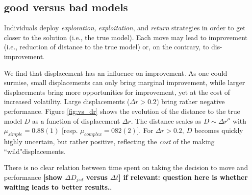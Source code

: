 %
%
%


\subsection{good versus bad models}
Individuals deploy {\it exploration}, {\it exploitation}, and {\it return} strategies in order to get closer to the solution (i.e., the true model). Each move may lead to improvement (i.e., reduction of distance to the true model) or, on the contrary, to dis-improvement. 

We find that displacement has an influence on improvement. As one could surmise, small displacements can only bring marginal improvement, while larger displacements bring more opportunities for improvement, yet at the cost of increased volatility. Large displacements ($\Delta r > 0.2$) bring rather negative performance. Figure \ref{fig:vs_dr} shows the evolution of the distance to the true model $D$ as a function of displacement $\Delta r$. The distance scales as $D \sim {\Delta r}^{\mu}$ with $\mu_{simple} = 0.88(1)$ [resp. $\mu_{complex} = 082(2)$]. For $\Delta r > 0.2$, $D$ becomes quickly highly uncertain, but rather positive, reflecting the {\it cost} of the making ``wild"displacements. 

There is no clear relation between time spent on taking the decision to move and performance {\bf [show $\Delta D_{jsd}$ versus $\Delta t$] if relevant: question here is whether waiting leads to better results.}.


